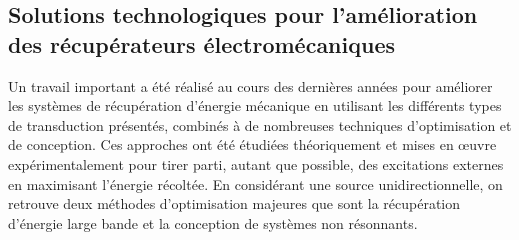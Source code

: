 	\subsection{Solutions technologiques pour l'amélioration des récupérateurs électromécaniques}
	\label{subsec:1.3.4_Solutions technologiques pour l amelioration des recuperateurs}
Un travail important a été réalisé au cours des dernières années pour améliorer les systèmes de récupération d'énergie mécanique en utilisant les différents types de transduction présentés, combinés à de nombreuses techniques d'optimisation et de conception. Ces approches ont été étudiées théoriquement et mises en \oe{}uvre expérimentalement pour tirer parti, autant que possible, des excitations externes en maximisant l'énergie récoltée. En considérant une source unidirectionnelle, on retrouve deux méthodes d'optimisation majeures que sont la récupération d'énergie large bande et la conception de systèmes non résonnants.

